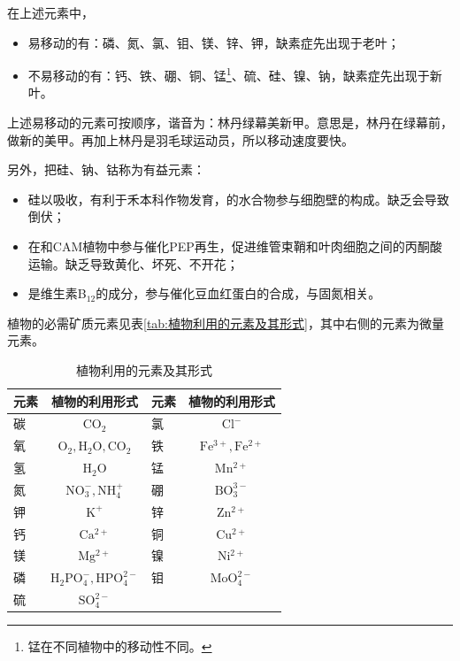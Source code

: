 在上述元素中，
\begin{itemize}
	\item 易移动的有：磷、氮、氯、钼、镁、锌、钾，缺素症先出现于老叶；
	\item 不易移动的有：钙、铁、硼、铜、锰\footnote{锰在不同植物中的移动性不同。}、硫、硅、镍、钠，缺素症先出现于新叶。
\end{itemize}

\begin{qj}[：易移动的元素记忆法]
	上述易移动的元素可按顺序，谐音为：林丹绿幕美新甲。意思是，林丹在绿幕前，做新的美甲。再加上林丹是羽毛球运动员，所以移动速度要快。
\end{qj}

另外，把硅、钠、钴称为有益元素：

\begin{itemize}
	\item 硅以吸收，有利于禾本科作物发育，的水合物参与细胞壁的构成。缺乏会导致倒伏；
	\item {}在和CAM植物中参与催化PEP再生，促进维管束鞘和叶肉细胞之间的丙酮酸运输。缺乏导致黄化、坏死、不开花；
	\item {}是维生素B$_{12}$的成分，参与催化豆血红蛋白的合成，与固氮相关。
\end{itemize}

植物的必需矿质元素见表\autoref{tab:植物利用的元素及其形式}，其中右侧的元素为微量元素。

\begin{table}[htbp]
	\centering
	\begin{tabularx}{\textwidth}{|>{\centering\arraybackslash}m{3em}|C||>{\centering\arraybackslash}m{3em}|C|}
		\hline
		\textbf{元素} & \textbf{植物的利用形式} & \textbf{元素} & \textbf{植物的利用形式} \\ \hline
		碳  & $ \mathrm{CO_2} $                & 氯  & $ \mathrm{Cl^-} $                \\ \hline
		氧  & $ \mathrm{O_2}, \mathrm{H_2O}, \mathrm{CO_2} $       & 铁  & $ \mathrm{Fe^{3+}}, \mathrm{Fe^{2+}} $        \\ \hline
		氢  & $ \mathrm{H_2O} $                & 锰  & $ \mathrm{Mn^{2+}} $               \\ \hline
		氮  & $ \mathrm{NO_3^-}, \mathrm{NH_4^+} $        & 硼  & $ \mathrm{BO_3^{3-}} $              \\ \hline
		钾  & $ \mathrm{K^+} $                 & 锌  & $ \mathrm{Zn^{2+}} $               \\ \hline
		钙  & $ \mathrm{Ca^{2+}} $               & 铜  & $ \mathrm{Cu^{2+}} $               \\ \hline
		镁  & $ \mathrm{Mg^{2+}} $               & 镍  & $ \mathrm{Ni^{2+}} $               \\ \hline
		磷  & $ \mathrm{H_2PO_4^-}, \mathrm{HPO_4^{2-}} $    & 钼  & $ \mathrm{MoO_4^{2-}} $             \\ \hline
		硫  & $ \mathrm{SO_4^{2-}} $              &  &  \\ \hline
	\end{tabularx}
	\caption{植物利用的元素及其形式}
	\label{tab:植物利用的元素及其形式}
\end{table}

